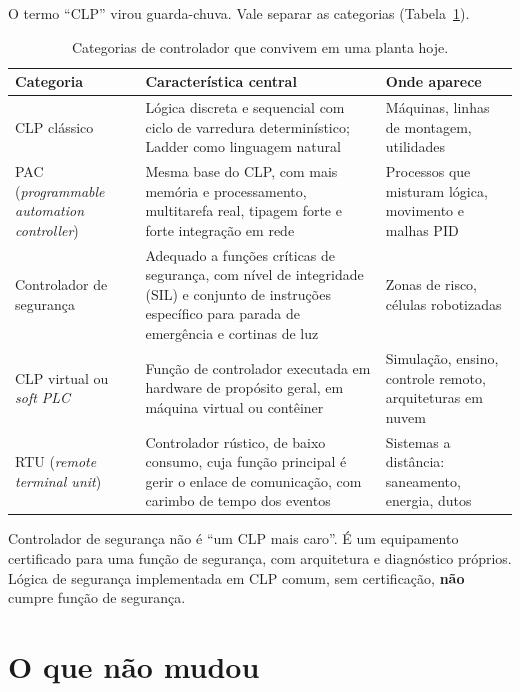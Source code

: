 O termo ``CLP'' virou guarda-chuva. Vale separar as categorias
(Tabela~\ref{tab:categorias-controladores}).

\begin{table}[H]
  \centering
  \caption{Categorias de controlador que convivem em uma planta hoje.}
  \label{tab:categorias-controladores}
  \begin{tabular}{p{3.4cm} p{6.4cm} p{4.8cm}}
    \toprule
    Categoria & Característica central & Onde aparece \\
    \midrule
    CLP clássico
      & Lógica discreta e sequencial com ciclo de varredura determinístico; Ladder como linguagem natural
      & Máquinas, linhas de montagem, utilidades \\
    PAC (\emph{programmable automation controller})
      & Mesma base do CLP, com mais memória e processamento, multitarefa real, tipagem forte e forte
        integração em rede
      & Processos que misturam lógica, movimento e malhas PID \\
    Controlador de segurança
      & Adequado a funções críticas de segurança, com nível de integridade (SIL) e conjunto de
        instruções específico para parada de emergência e cortinas de luz
      & Zonas de risco, células robotizadas \\
    CLP virtual ou \emph{soft PLC}
      & Função de controlador executada em hardware de propósito geral, em máquina virtual ou
        contêiner
      & Simulação, ensino, controle remoto, arquiteturas em nuvem \\
    RTU (\emph{remote terminal unit})
      & Controlador rústico, de baixo consumo, cuja função principal é gerir o enlace de
        comunicação, com carimbo de tempo dos eventos
      & Sistemas a distância: saneamento, energia, dutos \\
    \bottomrule
  \end{tabular}
\end{table}

\begin{atencao}
Controlador de segurança não é ``um CLP mais caro''. É um equipamento certificado para uma função
de segurança, com arquitetura e diagnóstico próprios. Lógica de segurança implementada em CLP
comum, sem certificação, \textbf{não} cumpre função de segurança.
\end{atencao}

\section{O que não mudou}

